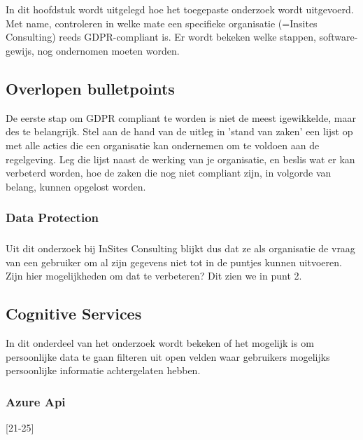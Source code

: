 
\chapter{}
\label{ch:methodologie}

In dit hoofdstuk wordt uitgelegd hoe het toegepaste onderzoek wordt uitgevoerd. Met name, controleren in welke mate een specifieke organisatie (=Insites Consulting) reeds GDPR-compliant is. Er wordt bekeken welke stappen, software-gewijs, nog ondernomen moeten worden. 



\section{Overlopen bulletpoints}
De eerste stap om GDPR compliant te worden is niet de meest igewikkelde, maar des te belangrijk. Stel aan de hand van de uitleg in 'stand van zaken' een lijst op met alle acties die een organisatie kan ondernemen om te voldoen aan de regelgeving. Leg die lijst naast de werking van je organisatie, en beslis wat er kan verbeterd worden, hoe de zaken die nog niet compliant zijn, in volgorde van belang, kunnen opgelost worden.  

\subsection{Data Protection}


\subsection{}
Uit dit onderzoek bij InSites Consulting blijkt dus dat ze als organisatie de vraag van een gebruiker om al zijn gegevens niet tot in de puntjes kunnen uitvoeren. Zijn hier mogelijkheden om dat te verbeteren? Dit zien we in punt 2. 

\section{Cognitive Services}
In dit onderdeel van het onderzoek wordt bekeken of het mogelijk is om persoonlijke data te gaan filteren uit open velden waar gebruikers mogelijks persoonlijke informatie achtergelaten hebben. 

\subsection{Azure Api }

[21-25]

